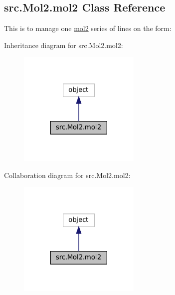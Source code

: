 \hypertarget{classsrc_1_1Mol2_1_1mol2}{}\subsection{src.\+Mol2.\+mol2 Class Reference}
\label{classsrc_1_1Mol2_1_1mol2}


This is to manage one \hyperlink{classsrc_1_1Mol2_1_1mol2}{mol2} series of lines on the form\+:  




Inheritance diagram for src.\+Mol2.\+mol2\+:
\nopagebreak
\begin{figure}[H]
\begin{center}
\leavevmode
\includegraphics[width=165pt]{classsrc_1_1Mol2_1_1mol2__inherit__graph}
\end{center}
\end{figure}


Collaboration diagram for src.\+Mol2.\+mol2\+:
\nopagebreak
\begin{figure}[H]
\begin{center}
\leavevmode
\includegraphics[width=165pt]{classsrc_1_1Mol2_1_1mol2__coll__graph}
\end{center}
\end{figure}
